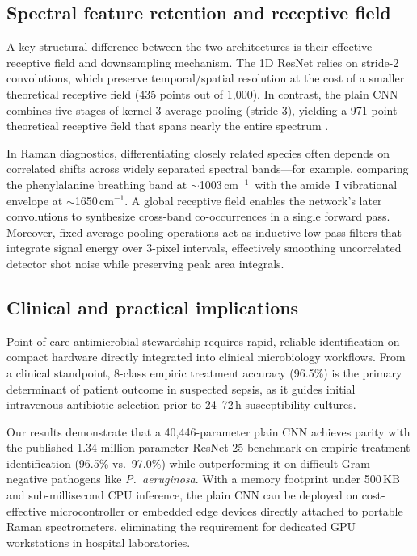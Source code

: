 \documentclass[journal,onecolumn]{IEEEtran}
\newcommand{\wn}{\,cm$^{-1}$}              %
\begin{document}
\subsection{Spectral feature retention and receptive field}
\label{sec:disc-features}
A key structural difference between the two architectures is their effective
receptive field and downsampling mechanism. The 1D ResNet relies on stride-2
convolutions, which preserve temporal/spatial resolution at the cost of a smaller
theoretical receptive field (435 points out of 1{,}000). In contrast, the plain
CNN combines five stages of kernel-3 average pooling (stride 3), yielding a
971-point theoretical receptive field that spans nearly the entire spectrum
\cite{luo2016understanding}.

In Raman diagnostics, differentiating closely related species often depends on
correlated shifts across widely separated spectral bands---for example, comparing
the phenylalanine breathing band at $\sim$1003\wn\ with the amide~I vibrational
envelope at $\sim$1650\wn. A global receptive field enables the network's later
convolutions to synthesize cross-band co-occurrences in a single forward pass.
Moreover, fixed average pooling operations act as inductive low-pass filters that
integrate signal energy over 3-pixel intervals, effectively smoothing uncorrelated
detector shot noise while preserving peak area integrals.

\subsection{Clinical and practical implications}
\label{sec:disc-clinical}
Point-of-care antimicrobial stewardship requires rapid, reliable identification
on compact hardware directly integrated into clinical microbiology workflows.
From a clinical standpoint, 8-class empiric treatment accuracy (96.5\%) is the
primary determinant of patient outcome in suspected sepsis, as it guides initial
intravenous antibiotic selection prior to 24--72\,h susceptibility cultures.

Our results demonstrate that a 40{,}446-parameter plain CNN achieves parity with
the published 1.34-million-parameter ResNet-25 benchmark on empiric treatment
identification (96.5\% vs.\ 97.0\%) while outperforming it on difficult Gram-negative
pathogens like \textit{P.~aeruginosa}. With a memory footprint under 500\,KB and
sub-millisecond CPU inference, the plain CNN can be deployed on cost-effective
microcontroller or embedded edge devices directly attached to portable Raman
spectrometers, eliminating the requirement for dedicated GPU workstations in hospital
laboratories.
\end{document}
